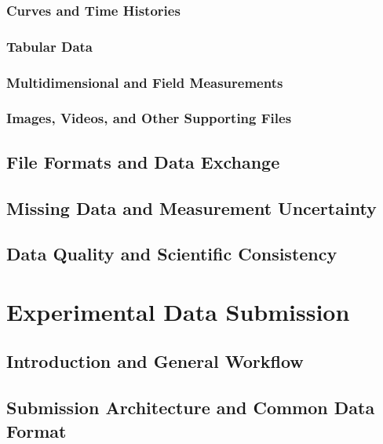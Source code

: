 \subsection{Curves and Time Histories}

\subsection{Tabular Data}

\subsection{Multidimensional and Field Measurements}

\subsection{Images, Videos, and Other Supporting Files}

\section{File Formats and Data Exchange}

\section{Missing Data and Measurement Uncertainty}

\section{Data Quality and Scientific Consistency}


\chapter{Experimental Data Submission}
\label{chap:experimental-submission}

\section{Introduction and General Workflow}

\section{Submission Architecture and Common Data Format}

